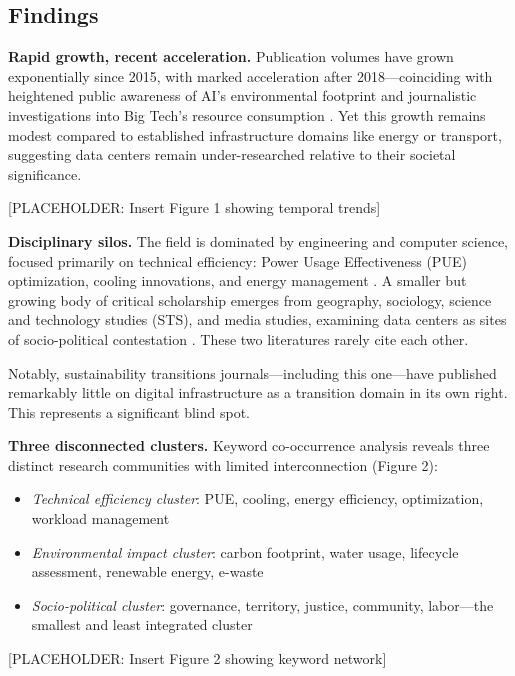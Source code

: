 \documentclass[review]{elsarticle}
\begin{document}
\subsection{Findings}

\textbf{Rapid growth, recent acceleration.} Publication volumes have grown exponentially since 2015, with marked acceleration after 2018---coinciding with heightened public awareness of AI's environmental footprint and journalistic investigations into Big Tech's resource consumption \citep{Crawford2021}. Yet this growth remains modest compared to established infrastructure domains like energy or transport, suggesting data centers remain under-researched relative to their societal significance.

[PLACEHOLDER: Insert Figure 1 showing temporal trends]

\textbf{Disciplinary silos.} The field is dominated by engineering and computer science, focused primarily on technical efficiency: Power Usage Effectiveness (PUE) optimization, cooling innovations, and energy management \citep{Zhang2025}. A smaller but growing body of critical scholarship emerges from geography, sociology, science and technology studies (STS), and media studies, examining data centers as sites of socio-political contestation \citep{Holt2015, Johnson2019, Brodie2021}. These two literatures rarely cite each other.

Notably, sustainability transitions journals---including this one---have published remarkably little on digital infrastructure as a transition domain in its own right. This represents a significant blind spot.

\textbf{Three disconnected clusters.} Keyword co-occurrence analysis reveals three distinct research communities with limited interconnection (Figure 2):

\begin{itemize}
    \item \textit{Technical efficiency cluster}: PUE, cooling, energy efficiency, optimization, workload management
    \item \textit{Environmental impact cluster}: carbon footprint, water usage, lifecycle assessment, renewable energy, e-waste
    \item \textit{Socio-political cluster}: governance, territory, justice, community, labor---the smallest and least integrated cluster
\end{itemize}

[PLACEHOLDER: Insert Figure 2 showing keyword network]
\end{document}
